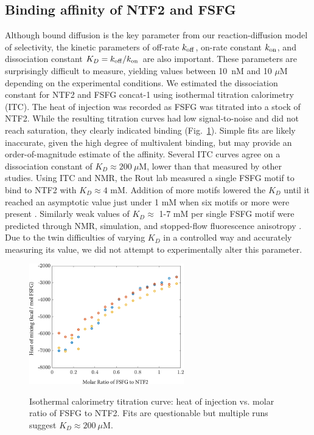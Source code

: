 \subsection{Binding affinity of NTF2 and FSFG}
Although bound diffusion is the key parameter from our reaction-diffusion model of selectivity, the kinetic parameters of off-rate $k_{\rm off}$, on-rate constant $k_{\rm on}$, and dissociation constant $K_D = k_{\rm off}/k_{\rm on}$ are also important. These parameters are surprisingly difficult to measure, yielding values between 10~nM and 10 $\mu$M depending on the experimental conditions.  We estimated the dissociation constant for NTF2 and FSFG concat-1 using isothermal titration calorimetry (ITC).  The heat of injection was recorded as FSFG was titrated into a stock of NTF2.  While the resulting titration curves had low signal-to-noise and did not reach saturation, they clearly indicated binding (Fig.~\ref{fig:ITC-runs}).  Simple fits are likely inaccurate, given the high degree of multivalent binding, but may provide an order-of-magnitude estimate of the affinity.  Several ITC curves agree on a dissociation constant of $K_D \approx 200 \ \mu$M, lower than that measured by other studies.  Using ITC and NMR, the Rout lab measured a single FSFG motif to bind to NTF2 with $K_D\approx 4$ mM.  Addition of more motifs lowered the $K_D$ until it reached an asymptotic value just under 1 mM when six motifs or more were present \cite{hayama18}.   Similarly weak values of $K_D \approx$ 1-7 mM per single FSFG motif were predicted through NMR, simulation, and stopped-flow fluorescence anisotropy \cite{milles15}.  Due to the twin difficulties of varying $K_D$ in a controlled way and accurately measuring its value, we did not attempt to experimentally alter this parameter. 

\begin{figure}
\caption[Isothermal titration calorimetry with NTF2 and FSFG.]{Isothermal calorimetry titration curve: heat of injection vs. molar ratio of FSFG to NTF2. Fits are questionable but multiple runs suggest $K_D \approx 200\ \mu$M.}
\centering
\includegraphics[width=0.6\textwidth]{figs/ch04/ITC_runs}
\label{fig:ITC-runs}
\end{figure} 

